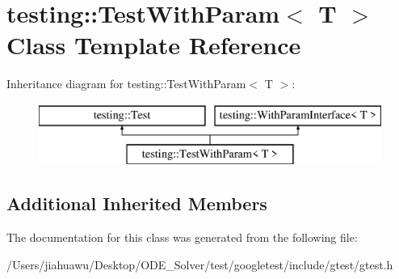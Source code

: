 \hypertarget{classtesting_1_1_test_with_param}{}\section{testing\+:\+:Test\+With\+Param$<$ T $>$ Class Template Reference}
\label{classtesting_1_1_test_with_param}
Inheritance diagram for testing\+:\+:Test\+With\+Param$<$ T $>$\+:\begin{figure}[H]
\begin{center}
\leavevmode
\includegraphics[height=2.000000cm]{classtesting_1_1_test_with_param}
\end{center}
\end{figure}
\subsection*{Additional Inherited Members}


The documentation for this class was generated from the following file\+:\begin{DoxyCompactItemize}
\item 
/\+Users/jiahuawu/\+Desktop/\+O\+D\+E\+\_\+\+Solver/test/googletest/include/gtest/gtest.\+h\end{DoxyCompactItemize}
